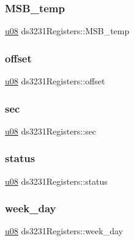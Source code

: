 \subsubsection{\texorpdfstring{M\+S\+B\+\_\+temp}{MSB\_temp}}
{\footnotesize\ttfamily \hyperlink{main_8h_ae2b6b8613a28b013c8c7fdaf93cdb1e1}{u08} ds3231\+Registers\+::\+M\+S\+B\+\_\+temp}

\mbox{\label{structds3231Registers_ad274594b1793d71bfb4d2566013287aa}} 
\subsubsection{\texorpdfstring{offset}{offset}}
{\footnotesize\ttfamily \hyperlink{main_8h_ae2b6b8613a28b013c8c7fdaf93cdb1e1}{u08} ds3231\+Registers\+::offset}

\mbox{\label{structds3231Registers_ad6ce5e46b27423f764cbf9d8ef35dbe6}} 
\subsubsection{\texorpdfstring{sec}{sec}}
{\footnotesize\ttfamily \hyperlink{main_8h_ae2b6b8613a28b013c8c7fdaf93cdb1e1}{u08} ds3231\+Registers\+::sec}

\mbox{\label{structds3231Registers_a2cf5b9fda6f23f1970409c591251df87}} 
\subsubsection{\texorpdfstring{status}{status}}
{\footnotesize\ttfamily \hyperlink{main_8h_ae2b6b8613a28b013c8c7fdaf93cdb1e1}{u08} ds3231\+Registers\+::status}

\mbox{\label{structds3231Registers_a05a09f7ebf82613932028007e964d41a}} 
\subsubsection{\texorpdfstring{week\+\_\+day}{week\_day}}
{\footnotesize\ttfamily \hyperlink{main_8h_ae2b6b8613a28b013c8c7fdaf93cdb1e1}{u08} ds3231\+Registers\+::week\+\_\+day}

